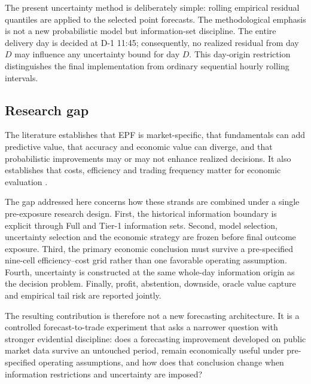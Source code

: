 The present uncertainty method is deliberately simple: rolling empirical residual quantiles are applied to the selected point forecasts. The methodological emphasis is not a new probabilistic model but information-set discipline. The entire delivery day is decided at D-1 11:45; consequently, no realized residual from day \(D\) may influence any uncertainty bound for day \(D\). This day-origin restriction distinguishes the final implementation from ordinary sequential hourly rolling intervals.

\subsection{Research gap}

The literature establishes that EPF is market-specific, that fundamentals can add predictive value, that accuracy and economic value can diverge, and that probabilistic improvements may or may not enhance realized decisions. It also establishes that costs, efficiency and trading frequency matter for economic evaluation \citep{serafin2025,maciejowska2026}.

The gap addressed here concerns how these strands are combined under a single pre-exposure research design. First, the historical information boundary is explicit through Full and Tier-1 information sets. Second, model selection, uncertainty selection and the economic strategy are frozen before final outcome exposure. Third, the primary economic conclusion must survive a pre-specified nine-cell efficiency--cost grid rather than one favorable operating assumption. Fourth, uncertainty is constructed at the same whole-day information origin as the decision problem. Finally, profit, abstention, downside, oracle value capture and empirical tail risk are reported jointly.

The resulting contribution is therefore not a new forecasting architecture. It is a controlled forecast-to-trade experiment that asks a narrower question with stronger evidential discipline: does a forecasting improvement developed on public market data survive an untouched period, remain economically useful under pre-specified operating assumptions, and how does that conclusion change when information restrictions and uncertainty are imposed?
